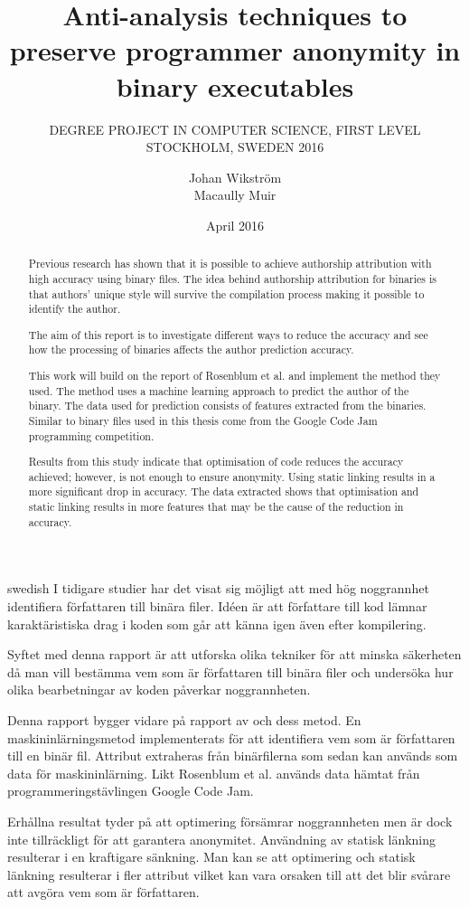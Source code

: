 \documentclass[a4paper,11pt]{kth-mag}
\title{Anti-analysis techniques to preserve programmer anonymity in binary
executables}
\subtitle{
    DEGREE PROJECT IN COMPUTER SCIENCE, FIRST LEVEL \\
    STOCKHOLM, SWEDEN 2016
}
\author{Johan Wikström \\ Macaully Muir}
\date{April 2016}
\begin{document}
\frontmatter
\pagestyle{empty}
\removepagenumbers
\maketitle
{}
\begin{abstract}
Previous research has shown that it is possible to achieve authorship
attribution with high accuracy using binary files. The idea behind authorship
attribution for binaries is that authors’ unique style will survive the
compilation process making it possible to identify the author.    

The aim of this report is to investigate different ways to reduce the accuracy
and see how the processing of binaries affects the author prediction accuracy.

This work will build on the report of Rosenblum et al. and implement the method
they used. The method uses  a machine learning approach to predict the author
of the binary. The data used for prediction consists of features extracted from
the binaries. Similar to \parencite{rosenblum2011wrote} binary files used in this
thesis come from the Google Code Jam programming competition.

Results from this study indicate that optimisation of code reduces the accuracy
achieved; however, is not enough to ensure anonymity. Using static linking
results in a more significant drop in accuracy. The data extracted shows that
optimisation and static linking results in more features that may be the cause
of the reduction in accuracy.
\end{abstract}
\clearpage
\begin{foreignabstract}{swedish}
I tidigare studier har det visat sig möjligt att med hög noggrannhet
identifiera författaren till binära filer. Idéen är att författare till kod
lämnar karaktäristiska drag i koden som går att känna igen även efter
kompilering. 

Syftet med denna rapport är att utforska olika tekniker för att minska
säkerheten då man vill bestämma vem som är författaren till binära filer och
undersöka hur olika bearbetningar av koden påverkar noggrannheten.     

Denna rapport bygger vidare på rapport av \parencite{rosenblum2011wrote}
och dess metod. En maskininlärningsmetod implementerats för
att identifiera vem som är författaren till en binär fil. Attribut extraheras
från binärfilerna som sedan kan används som data för maskininlärning. Likt
Rosenblum et al. används data hämtat från programmeringstävlingen Google Code
Jam. 

Erhållna resultat tyder på att optimering försämrar noggrannheten men är dock
inte tillräckligt för att garantera anonymitet. Användning av statisk länkning
resulterar i en kraftigare sänkning. Man kan se att optimering och statisk
länkning resulterar i fler attribut vilket kan vara orsaken till att det blir
svårare att avgöra vem som är författaren.
\end{foreignabstract}
\clearpage
\tableofcontents*
\mainmatter
\pagestyle{newchap}
\end{document}
